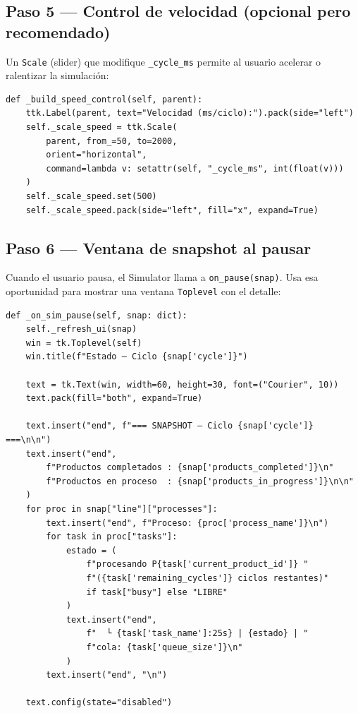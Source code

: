\documentclass[12pt,letterpaper]{article}
\begin{document}
\subsection{Paso 5 — Control de velocidad (opcional pero recomendado)}

Un \texttt{Scale} (slider) que modifique \texttt{\_cycle\_ms} permite al
usuario acelerar o ralentizar la simulación:

\begin{lstlisting}
def _build_speed_control(self, parent):
    ttk.Label(parent, text="Velocidad (ms/ciclo):").pack(side="left")
    self._scale_speed = ttk.Scale(
        parent, from_=50, to=2000,
        orient="horizontal",
        command=lambda v: setattr(self, "_cycle_ms", int(float(v)))
    )
    self._scale_speed.set(500)
    self._scale_speed.pack(side="left", fill="x", expand=True)
\end{lstlisting}

\subsection{Paso 6 — Ventana de snapshot al pausar}

Cuando el usuario pausa, el Simulator llama a \texttt{on\_pause(snap)}. Usa
esa oportunidad para mostrar una ventana \texttt{Toplevel} con el detalle:

\begin{lstlisting}
def _on_sim_pause(self, snap: dict):
    self._refresh_ui(snap)
    win = tk.Toplevel(self)
    win.title(f"Estado — Ciclo {snap['cycle']}")

    text = tk.Text(win, width=60, height=30, font=("Courier", 10))
    text.pack(fill="both", expand=True)

    text.insert("end", f"=== SNAPSHOT — Ciclo {snap['cycle']} ===\n\n")
    text.insert("end",
        f"Productos completados : {snap['products_completed']}\n"
        f"Productos en proceso  : {snap['products_in_progress']}\n\n"
    )
    for proc in snap["line"]["processes"]:
        text.insert("end", f"Proceso: {proc['process_name']}\n")
        for task in proc["tasks"]:
            estado = (
                f"procesando P{task['current_product_id']} "
                f"({task['remaining_cycles']} ciclos restantes)"
                if task["busy"] else "LIBRE"
            )
            text.insert("end",
                f"  └ {task['task_name']:25s} | {estado} | "
                f"cola: {task['queue_size']}\n"
            )
        text.insert("end", "\n")

    text.config(state="disabled")
\end{lstlisting}
\end{document}
